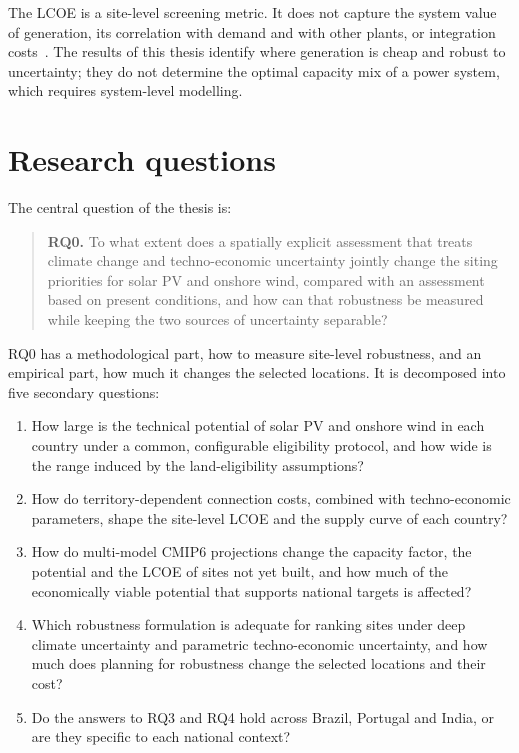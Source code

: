 The LCOE is a site-level screening metric. It does not capture the system value of generation, its correlation with demand and with other plants, or integration costs~\cite{ueckerdt2013}. The results of this thesis identify where generation is cheap and robust to uncertainty; they do not determine the optimal capacity mix of a power system, which requires system-level modelling.

\section{Research questions}
\label{sec:questions}

The central question of the thesis is:

\begin{quote}
\textbf{RQ0.} To what extent does a spatially explicit assessment that treats climate change and techno-economic uncertainty jointly change the siting priorities for solar PV and onshore wind, compared with an assessment based on present conditions, and how can that robustness be measured while keeping the two sources of uncertainty separable?
\end{quote}

RQ0 has a methodological part, how to measure site-level robustness, and an empirical part, how much it changes the selected locations. It is decomposed into five secondary questions:

\begin{enumerate}
    \item[\textbf{RQ1.}] How large is the technical potential of solar PV and onshore wind in each country under a common, configurable eligibility protocol, and how wide is the range induced by the land-eligibility assumptions?
    \item[\textbf{RQ2.}] How do territory-dependent connection costs, combined with techno-economic parameters, shape the site-level LCOE and the supply curve of each country?
    \item[\textbf{RQ3.}] How do multi-model CMIP6 projections change the capacity factor, the potential and the LCOE of sites not yet built, and how much of the economically viable potential that supports national targets is affected?
    \item[\textbf{RQ4.}] Which robustness formulation is adequate for ranking sites under deep climate uncertainty and parametric techno-economic uncertainty, and how much does planning for robustness change the selected locations and their cost?
    \item[\textbf{RQ5.}] Do the answers to RQ3 and RQ4 hold across Brazil, Portugal and India, or are they specific to each national context?
\end{enumerate}

